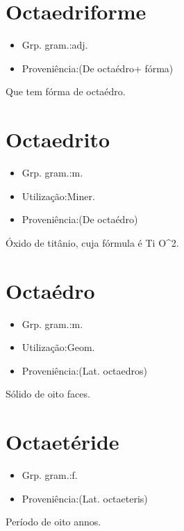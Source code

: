 \section{Octaedriforme}
\begin{itemize}
\item {Grp. gram.:adj.}
\end{itemize}
\begin{itemize}
\item {Proveniência:(De \textunderscore octaédro\textunderscore  + \textunderscore fórma\textunderscore )}
\end{itemize}
Que tem fórma de octaédro.
\section{Octaedrito}
\begin{itemize}
\item {Grp. gram.:m.}
\end{itemize}
\begin{itemize}
\item {Utilização:Miner.}
\end{itemize}
\begin{itemize}
\item {Proveniência:(De \textunderscore octaédro\textunderscore )}
\end{itemize}
Óxido de titânio, cuja fórmula é Ti O^2.
\section{Octaédro}
\begin{itemize}
\item {Grp. gram.:m.}
\end{itemize}
\begin{itemize}
\item {Utilização:Geom.}
\end{itemize}
\begin{itemize}
\item {Proveniência:(Lat. \textunderscore octaedros\textunderscore )}
\end{itemize}
Sólido de oito faces.
\section{Octaetéride}
\begin{itemize}
\item {Grp. gram.:f.}
\end{itemize}
\begin{itemize}
\item {Proveniência:(Lat. \textunderscore octaeteris\textunderscore )}
\end{itemize}
Período de oito annos.
